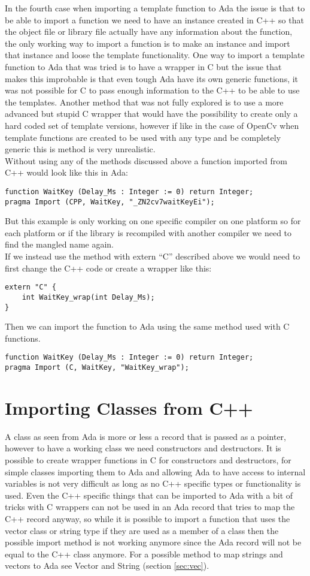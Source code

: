 In the fourth case when importing a template function to Ada the issue is that to be able to import a function we need to have an instance created in C++ so that the object file or library file actually have any information about the function, the only working way to import a function is to make an instance and import that instance and loose the template functionality. One way to import a template function to Ada that was tried is to have a wrapper in C but the issue that makes this improbable is that even tough Ada have its own generic functions, it was not possible for C to pass enough information to the C++ to be able to use the templates. Another method that was not fully explored is to use a more advanced but stupid C wrapper that would have the possibility to create only a hard coded set of template versions, however if like in the case of OpenCv when template functions are created to be used with any type and be completely generic this is method is very unrealistic. 
\\
Without using any of the methods discussed above a function imported from C++ would look like this in Ada:
\begin{lstlisting}
function WaitKey (Delay_Ms : Integer := 0) return Integer;
pragma Import (CPP, WaitKey, "_ZN2cv7waitKeyEi");
\end{lstlisting}
But this example is only working on one specific compiler on one platform so for each platform or if the library is recompiled with another compiler we need to find the mangled name again.
\\
If we instead use the method with extern “C” described above we would need to first change the C++ code or create a wrapper like this:
\begin{lstlisting}
extern "C" {
	int WaitKey_wrap(int Delay_Ms);
}
\end{lstlisting}
Then we can import the function to Ada using the same method used with C functions.
\begin{lstlisting}
function WaitKey (Delay_Ms : Integer := 0) return Integer;
pragma Import (C, WaitKey, "WaitKey_wrap");
\end{lstlisting}
\section{Importing Classes from C++}
A class as seen from Ada is more or less a record that is passed as a pointer, however to have a working class we need constructors and destructors. It is possible to create wrapper functions in C for constructors and destructors, for simple classes importing them to Ada and allowing Ada to have access to internal variables is not very difficult as long as no C++ specific types or functionality is used. Even the C++ specific things that can be imported to Ada with a bit of tricks with C wrappers can not be used in an Ada record that tries to map the C++ record anyway, so while it is possible to import a function that uses the vector class or string type if they are used as a member of a class then the possible import method is not working anymore since the Ada record will not be equal to the C++ class anymore. For a possible method to map strings and vectors to Ada see Vector and String (section \ref{sec:vec}).
